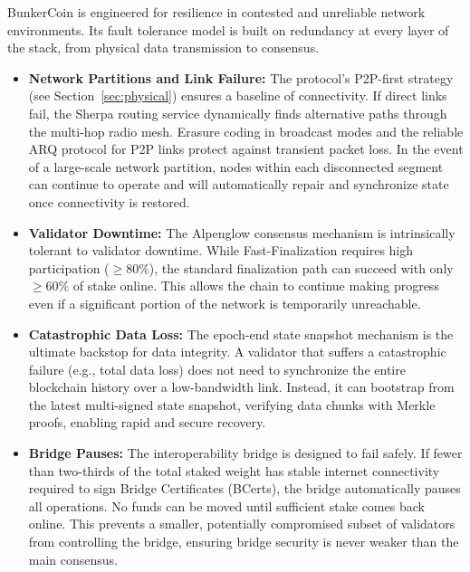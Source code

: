 \documentclass{article}
\begin{document}
BunkerCoin is engineered for resilience in contested and unreliable network environments. Its fault tolerance model is built on redundancy at every layer of the stack, from physical data transmission to consensus.

\begin{itemize}
    \item \textbf{Network Partitions and Link Failure:} The protocol's P2P-first strategy (see Section~\ref{sec:physical}) ensures a baseline of connectivity. If direct links fail, the Sherpa routing service dynamically finds alternative paths through the multi-hop radio mesh. Erasure coding in broadcast modes and the reliable ARQ protocol for P2P links protect against transient packet loss. In the event of a large-scale network partition, nodes within each disconnected segment can continue to operate and will automatically repair and synchronize state once connectivity is restored.

    \item \textbf{Validator Downtime:} The Alpenglow consensus mechanism is intrinsically tolerant to validator downtime. While Fast-Finalization requires high participation ($\geq 80\%$), the standard finalization path can succeed with only $\geq 60\%$ of stake online. This allows the chain to continue making progress even if a significant portion of the network is temporarily unreachable.

    \item \textbf{Catastrophic Data Loss:} The epoch-end state snapshot mechanism is the ultimate backstop for data integrity. A validator that suffers a catastrophic failure (e.g., total data loss) does not need to synchronize the entire blockchain history over a low-bandwidth link. Instead, it can bootstrap from the latest multi-signed state snapshot, verifying data chunks with Merkle proofs, enabling rapid and secure recovery.

    \item \textbf{Bridge Pauses:} The interoperability bridge is designed to fail safely. If fewer than two-thirds of the total staked weight has stable internet connectivity required to sign Bridge Certificates (BCerts), the bridge automatically pauses all operations. No funds can be moved until sufficient stake comes back online. This prevents a smaller, potentially compromised subset of validators from controlling the bridge, ensuring bridge security is never weaker than the main consensus.
\end{itemize}
\end{document}
